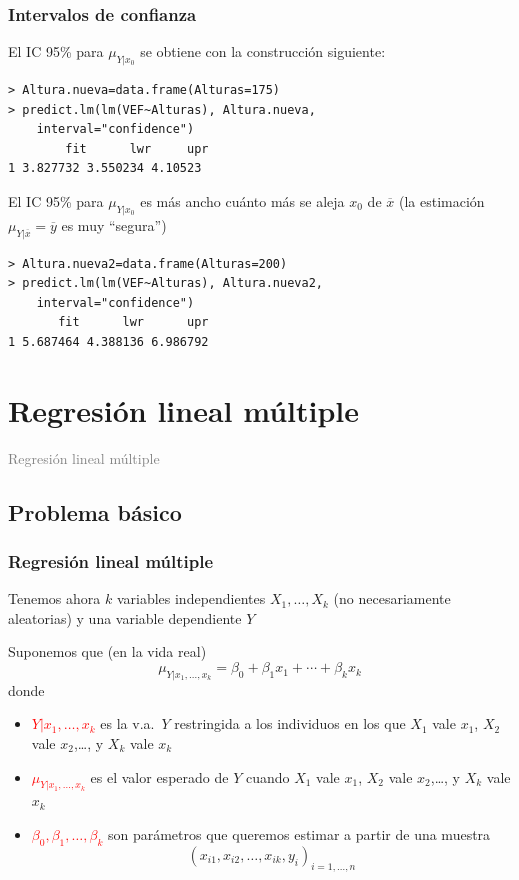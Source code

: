 \documentclass[12pt,t]{beamer}
\newcommand{\red}[1]{\textcolor{red}{#1}}
\newcommand{\gray}[1]{\textcolor{gray}{#1}}
\theoremstyle{plain}
\theoremstyle{definition}
\begin{document}
\begin{frame}[fragile]
\frametitle{Intervalos de confianza}
El IC 95\% para $\mu_{Y|x_0}$ se obtiene con la construcción siguiente:\medskip

\begin{lstlisting}
> Altura.nueva=data.frame(Alturas=175)
> predict.lm(lm(VEF~Alturas), Altura.nueva,
    interval="confidence")
        fit      lwr     upr
1 3.827732 3.550234 4.10523
\end{lstlisting}\medskip

El IC 95\% para $\mu_{Y|x_0}$ es más ancho cuánto más se aleja $x_0$ de $\overline{x}$ (la estimación $\mu_{Y|\overline{x}}=\overline{y}$ es muy ``segura'')\medskip

\begin{lstlisting}
> Altura.nueva2=data.frame(Alturas=200)
> predict.lm(lm(VEF~Alturas), Altura.nueva2,  
    interval="confidence")
       fit      lwr      upr
1 5.687464 4.388136 6.986792
\end{lstlisting}


\end{frame}

\section{Regresión lineal múltiple}
\begin{frame}
\vfill
\begin{center}
\gray{\LARGE Regresión lineal múltiple}
\end{center}
\vfill
\end{frame}

\subsection{Problema básico}
\begin{frame}
\frametitle{Regresión lineal múltiple}

Tenemos ahora $k$ variables independientes $X_1,\ldots, X_k$ (no necesariamente aleatorias) y una
variable dependiente $Y$
\medskip

Suponemos que (en la vida real)
$$
\mu_{Y|x_1,\ldots,x_k}= \beta_0+\beta_1 x_1+\cdots+\beta_k x_k
$$
donde
\begin{itemize}
\item \red{$Y|x_1,\ldots,x_k$} es la v.a.\ $Y$ restringida a los individuos en los que $X_1$ vale $x_1$, $X_2$ vale $x_2$,\ldots, y $X_k$ vale $x_k$\medskip

\item \red{$\mu_{Y|x_1,\ldots,x_k}$} es el valor esperado de $Y$ cuando $X_1$ vale $x_1$, $X_2$ vale $x_2$,\ldots, y $X_k$ vale $x_k$\medskip

\item \red{$\beta_0,\beta_1,\ldots,\beta_k$} son 
parámetros que queremos estimar a partir de una muestra
$$
(x_{i1},x_{i2},\ldots,x_{ik},y_i)_{i=1,\ldots,n}
$$
\end{itemize}
\end{frame}
\end{document}
